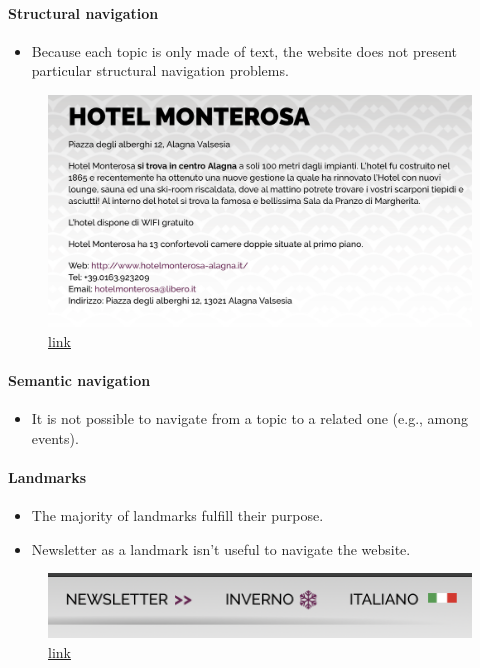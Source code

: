 \documentclass[a4paper, 11pt, parskip=half, headsepline]{scrreprt}
\begin{document}
\paragraph{Structural navigation}
\begin{itemize}
    \item Because each topic is only made of text, the website does not present particular structural navigation problems.
\end{itemize}

\begin{figure}[H]
        \centering
        \includegraphics[width=0.5\linewidth, keepaspectratio]{31-structural}
        \caption{\href{https://www.visitmonterosa.com/accommodation/hotel-monterosa/}{link}}
        \label{fig:structural-navigation-01}
\end{figure}

\paragraph{Semantic navigation}
\begin{itemize}
    \item It is not possible to navigate from a topic to a related one (e.g., among events).
\end{itemize}

\paragraph{Landmarks}
\begin{itemize}
    \item The majority of landmarks fulfill their purpose.
    \item Newsletter as a landmark isn't useful to navigate the website.
\end{itemize}

\begin{figure}[H]
        \centering
        \includegraphics[width=0.3\linewidth, keepaspectratio]{51-landmarks}
        \caption{\href{https://www.visitmonterosa.com}{link}}
        \label{fig:landmarks-01}
\end{figure}
\end{document}
